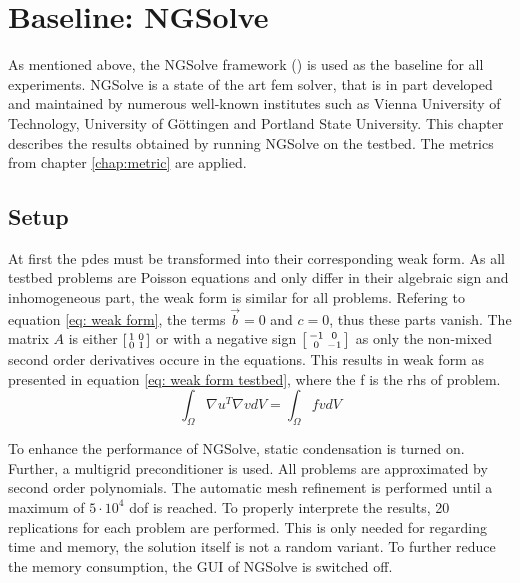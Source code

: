 \documentclass[./\jobname.tex]{subfiles}
\begin{document}
\section{Baseline: NGSolve}
As mentioned above, the NGSolve framework (\cite{schoberl_ngsolvengsolve_2020}) is used as the baseline for all experiments. NGSolve is a state of the art \gls{fem} solver, that is in part developed and maintained by numerous well-known institutes such as Vienna University of Technology, University of Göttingen and Portland State University. This chapter describes the results obtained by running NGSolve on the testbed. The metrics from chapter \ref{chap:metric} are applied. 

\subsection{Setup}
At first the \gls{pde}s must be transformed into their corresponding weak form. As all testbed problems are Poisson equations and only differ in their algebraic sign and inhomogeneous part, the weak form is similar for all problems. Refering to equation \ref{eq: weak form}, the terms $\vec{b} = 0$ and $c = 0$, thus these parts vanish. The matrix $A$ is either $\begin{bsmallmatrix} 1 & 0 \\ 0 & 1 \end{bsmallmatrix}$ or with a negative sign $\begin{bsmallmatrix} -1 & 0 \\ 0 & -1 \end{bsmallmatrix}$ as only the non-mixed second order derivatives occure in the equations. This results in weak form as presented in equation \ref{eq: weak form testbed}, where the f is the \gls{rhs} of problem.
\begin{equation}
\label{eq: weak form testbed}
\int_{\Omega} \nabla u^T \nabla v dV = \int_{\Omega} f v dV
\end{equation}

To enhance the performance of NGSolve, static condensation is turned on. Further, a multigrid preconditioner is used. All problems are approximated by second order polynomials. The automatic mesh refinement is performed until a maximum of $5 \cdot 10^4$ \gls{dof} is reached. To properly interprete the results, 20 replications for each problem are performed. This is only needed for regarding time and memory, the solution itself is not a random variant. To further reduce the memory consumption, the GUI of NGSolve is switched off. 
\end{document}
